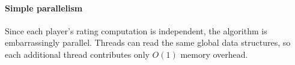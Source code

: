 \paragraph{Simple parallelism}
Since each player's rating computation is independent, the algorithm is embarrassingly parallel. Threads can read the same global data structures, so each additional thread contributes only $O(1)$ memory overhead.







